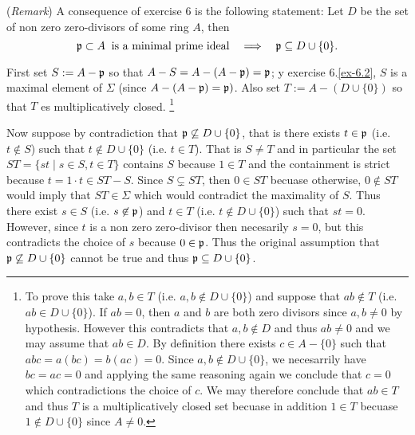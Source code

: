(\emph{Remark}) A consequence of exercise 6 is the following statement: Let $D$ be the set of non zero zero-divisors of some ring $A$, then
\[
	\mathfrak{p}\subset A\;\;\text{is a minimal prime ideal}\quad\Longrightarrow\quad \mathfrak{p}\subseteq D\cup\{0\}.
\]

First set $S:=A-\mathfrak{p}$ so that $A-S=A-(A-\mathfrak{p})=\mathfrak{p}$; y exercise 6.\ref{ex-6.2}, $S$ is a maximal element of $\Sigma$ (since $A-(A-\mathfrak{p})=\mathfrak{p})$. Also set $T:=A-(D\cup\{0\})$ so that $T$ es multiplicatively closed.%
%
\footnote{To prove this take $a,b\in T$ (i.e. $a,b\not\in D\cup\{0\}$) and suppose that $ab\not\in T$ (i.e. $ab\in D\cup\{0\}$). If $ab=0$, then $a$ and $b$ are both zero divisors since $a,b\neq0$ by hypothesis. However this contradicts that $a,b\not\in D$ and thus $ab\neq0$ and we may assume that $ab\in D$. By definition there exists $c\in A-\{0\}$ such that $abc=a(bc)=b(ac)=0$. Since $a,b\not\in D\cup\{0\}$, we necesarrily have $bc=ac=0$ and applying the same reasoning again we conclude that $c=0$ which contradictions the choice of $c$. We may therefore conclude that $ab\in T$ and thus $T$ is a multiplicatively closed set becuase in addition $1\in T$ becuase $1\not\in D\cup\{0\}$ since $A\neq0$.
}
 
Now suppose by contradiction that $\mathfrak{p}\not\subseteq D\cup\{0\}$, that is there exists $t\in\mathfrak{p}$ (i.e. $t\not\in S$) such that $t\not\in D\cup\{0\}$ (i.e. $t\in T$). That is $S\neq T$ and in particular the set $ST=\{st\mid s\in S,t\in T\}$ contains $S$ because $1\in T$ and the containment is strict because $t=1\cdot t\in ST-S$. Since $S\subsetneq ST$, then $0\in ST$ becuase otherwise, $0\not\in ST$ would imply that $ST\in\Sigma$ which would contradict the maximality of $S$. Thus there exist $s\in S$ (i.e. $s\not\in\mathfrak{p}$) and $t\in T$ (i.e. $t\not\in D\cup\{0\}$) such that $st=0$. However, since $t$ is a non zero zero-divisor then necesarily $s=0$, but this contradicts the choice of $s$ because $0\in\mathfrak{p}$. Thus the original assumption that $\mathfrak{p}\not\subseteq D\cup\{0\}$ cannot be true and thus $\mathfrak{p}\subseteq D\cup\{0\}$.

